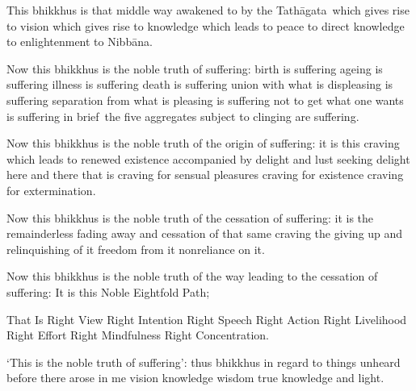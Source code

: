 \begin{english-only-hang}
  This bhikkhus is that middle way awakened to by the \mbox{Tathāgata}~which gives rise to vision which gives rise to knowledge which leads to peace to direct knowledge to enlightenment to Nibbāna.
\end{english-only-hang}

\begin{english-only-hang}
  Now this bhikkhus is the noble truth of suffering: birth is suffering ageing is suffering illness is suffering death is suffering union with what is displeasing is suffering separation from what is pleasing is suffering not to get what one wants is suffering in \mbox{brief}~the five aggregates subject to clinging are suffering.
\end{english-only-hang}

\begin{english-only-hang}
  Now this bhikkhus is the noble truth of the origin of suffering: it is this craving which leads to renewed existence accompanied by delight and lust seeking delight here and there that is craving for sensual pleasures craving for existence craving for extermination.
\end{english-only-hang}

\begin{english-only-hang}
  Now this bhikkhus is the noble truth of the cessation of suffering: it is the remainderless fading away and cessation of that same craving the giving up and relinquishing of it freedom from it nonreliance on it.
\end{english-only-hang}

\begin{english-only-hang}
  Now this bhikkhus is the noble truth of the way leading to the cessation of suffering: It is this Noble Eightfold Path;
\end{english-only-hang}

\begin{english-only-hang}
  That Is Right View Right Intention Right Speech Right Action Right Livelihood Right Effort Right Mindfulness Right Concentration.
\end{english-only-hang}

\begin{english-only-hang}
  `This is the noble truth of suffering': thus bhikkhus in regard to things unheard before there arose in me vision knowledge wisdom true knowledge and light.
\end{english-only-hang}


